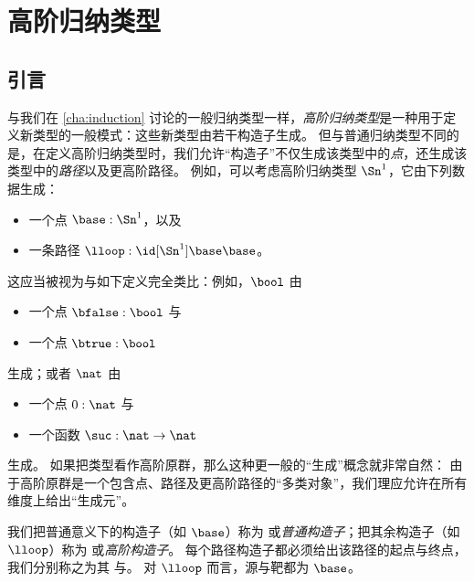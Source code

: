 \chapter{高阶归纳类型}
\label{cha:hits}

%
%
%
\section{引言}
\label{sec:intro-hits}


与我们在 \cref{cha:induction} 讨论的一般归纳类型一样，\emph{高阶归纳类型}是一种用于定义新类型的一般模式：这些新类型由若干构造子生成。
但与普通归纳类型不同的是，在定义高阶归纳类型时，我们允许“构造子”不仅生成该类型中的\emph{点}，还生成该类型中的\emph{路径}以及更高阶路径。
%
%
例如，可以考虑高阶归纳类型 $\Sn^1$，它由下列数据生成：
\begin{itemize}
\item 一个点 $\base:\Sn^1$，以及
\item 一条路径 $\lloop : {\id[\Sn^1]\base\base}$。
\end{itemize}
这应当被视为与如下定义完全类比：例如，$\bool$ 由
\begin{itemize}
\item 一个点 $\bfalse:\bool$ 与
\item 一个点 $\btrue:\bool$
\end{itemize}
生成；或者 $\nat$ 由
\begin{itemize}
\item 一个点 $0:\nat$ 与
\item 一个函数 $\suc:\nat\to\nat$
\end{itemize}
生成。
如果把类型看作高阶原群，那么这种更一般的“生成”概念就非常自然：
由于高阶原群是一个包含点、路径及更高阶路径的“多类对象”，我们理应允许在所有维度上给出“生成元”。

我们把普通意义下的构造子（如 $\base$）称为
%
%
或\emph{普通构造子}；把其余构造子（如 $\lloop$）称为
%
%
或\emph{高阶构造子}。
每个路径构造子都必须给出该路径的起点与终点，我们分别称之为其
%
与。
%
对 $\lloop$ 而言，源与靶都为 $\base$。

